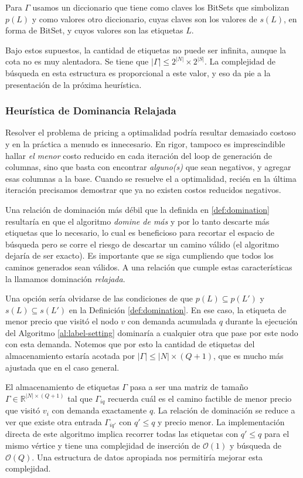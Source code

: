 Para $\Gamma$ usamos un diccionario que tiene como claves los BitSets que simbolizan $p(L)$ y como valores otro diccionario, cuyas claves son los valores de $s(L)$, en forma de BitSet, y cuyos valores son las etiquetas $L$. 

Bajo estos supuestos, la cantidad de etiquetas no puede ser infinita, aunque la cota no es muy alentadora. Se tiene que $|\Gamma| \leq 2^{|N|} \times 2^{|S|}$. La complejidad de búsqueda en esta estructura es proporcional a este valor, y eso da pie a la presentación de la próxima heurística.


\subsubsection{Heurística de Dominancia Relajada}
\label{subsubsection:segment-tree-heuristic}

Resolver el problema de pricing a optimalidad podría resultar demasiado costoso y en la práctica a menudo es innecesario. En rigor, tampoco es imprescindible hallar \emph{el menor} costo reducido en cada iteración del loop de generación de columnas, sino que basta con encontrar \emph{alguno(s)} que sean negativos, y agregar esas columnas a la base. Cuando se resuelve el  a optimalidad, recién en la última iteración precisamos demostrar que ya no existen costos reducidos negativos. 

Una relación de dominación más débil que la definida en \ref{def:domination} resultaría en que el algoritmo \emph{domine de más} y por lo tanto descarte más etiquetas que lo necesario, lo cual es beneficioso para recortar el espacio de búsqueda pero se corre el riesgo de descartar un camino válido (el algoritmo dejaría de ser exacto). Es importante que se siga cumpliendo que todos los caminos generados sean válidos. A una relación que cumple estas características la llamamos dominación \emph{relajada}.

Una opción sería olvidarse de las condiciones de que $p(L) \subseteq p(L')$ y $s(L) \subseteq s(L')$ en la Definición \ref{def:domination}. En ese caso, la etiqueta de menor precio que visitó el nodo $v$ con demanda acumulada $q$ durante la ejecución del Algoritmo \ref{al:label-setting} dominaría a cualquier otra que pase por este nodo con esta demanda. Notemos que por esto la cantidad de etiquetas del almacenamiento estaría acotada por $|\Gamma| \leq |N| \times (Q+1)$, que es mucho más ajustada que en el caso general.

El almacenamiento de etiquetas $\Gamma$ pasa a ser una matriz de tamaño $\Gamma \in \mathbb{R}^{|N| \times (Q+1)}$ tal que $\Gamma_{iq}$ recuerda cuál es el camino factible de menor precio que visitó $v_i$ con demanda exactamente $q$. La relación de dominación se reduce a ver que existe otra entrada $\Gamma_{iq'}$ con $q' \leq q$ y precio menor. La implementación directa de este algoritmo implica recorrer todas las etiquetas con $q' \leq q$ para el mismo vértice y tiene una complejidad de inserción de $\mathcal{O}(1)$ y búsqueda de $\mathcal{O}(Q)$. Una estructura de datos apropiada nos permitiría mejorar esta complejidad.

